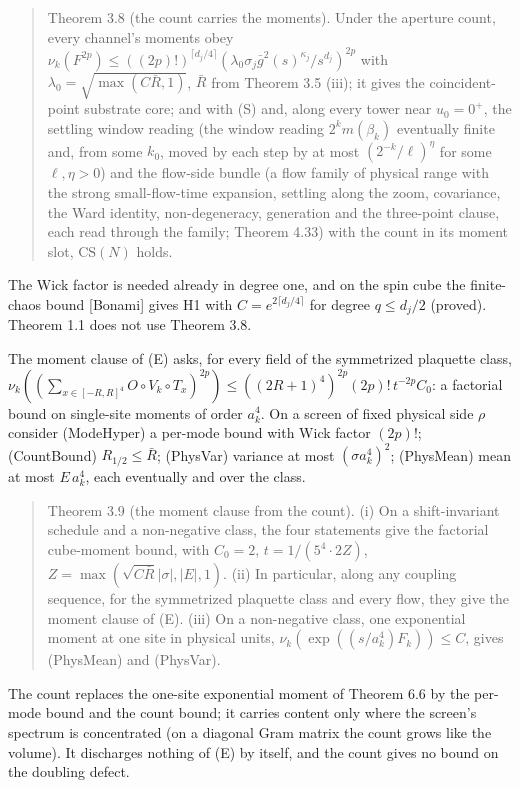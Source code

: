 \documentclass[10pt,letterpaper,twocolumn]{article}
\begin{document}
\begin{quote}
Theorem 3.8 (the count carries the moments). Under the aperture count, every channel's moments obey \(\nu_k(F^{2p})\le((2p)!)^{\lceil d_j/4\rceil}(\lambda_0\sigma_j\bar g^2(s)^{\kappa_j}/s^{d_j})^{2p}\) with \(\lambda_0=\sqrt{\max(C\bar R,1)}\), \(\bar R\) from Theorem 3.5 (iii); it gives the coincident-point substrate core; and with (S) and, along every tower near \(u_0=0^+\), the settling window reading (the window reading \(2^km(\beta_k)\) eventually finite and, from some \(k_0\), moved by each step by at most \((2^{-k}/\ell)^\eta\) for some \(\ell,\eta>0\)) and the flow-side bundle (a flow family of physical range with the strong small-flow-time expansion, settling along the zoom, covariance, the Ward identity, non-degeneracy, generation and the three-point clause, each read through the family; Theorem 4.33) with the count in its moment slot, \(\mathrm{CS}(N)\) holds.
\end{quote}

The Wick factor is needed already in degree one, and on the spin cube the finite-chaos bound {[}Bonami{]} gives H1 with \(C=e^{2\lceil d_j/4\rceil}\) for degree \(q\le d_j/2\) (proved). Theorem 1.1 does not use Theorem 3.8.

The moment clause of (E) asks, for every field of the symmetrized plaquette class, \(\nu_k((\sum_{x\in[-R,R]^4}O\circ V_k\circ T_x)^{2p})\le((2R+1)^4)^{2p}(2p)!\,t^{-2p}C_0\): a factorial bound on single-site moments of order \(a_k^4\). On a screen of fixed physical side \(\rho\) consider (ModeHyper) a per-mode bound with Wick factor \((2p)!\); (CountBound) \(R_{1/2}\le\bar R\); (PhysVar) variance at most \((\sigma a_k^4)^2\); (PhysMean) mean at most \(E\,a_k^4\), each eventually and over the class.

\begin{quote}
Theorem 3.9 (the moment clause from the count). (i) On a shift-invariant schedule and a non-negative class, the four statements give the factorial cube-moment bound, with \(C_0=2\), \(t=1/(5^4\cdot2Z)\), \(Z=\max(\sqrt{C\bar R}|\sigma|,|E|,1)\). (ii) In particular, along any coupling sequence, for the symmetrized plaquette class and every flow, they give the moment clause of (E). (iii) On a non-negative class, one exponential moment at one site in physical units, \(\nu_k(\exp((s/a_k^4)F_k))\le C\), gives (PhysMean) and (PhysVar).
\end{quote}

The count replaces the one-site exponential moment of Theorem 6.6 by the per-mode bound and the count bound; it carries content only where the screen's spectrum is concentrated (on a diagonal Gram matrix the count grows like the volume). It discharges nothing of (E) by itself, and the count gives no bound on the doubling defect.
\end{document}
